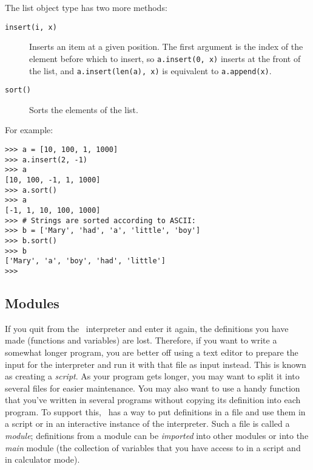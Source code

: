 The list object type has two more methods:
\begin{description}
\item[{\tt insert(i, x)}]
Inserts an item at a given position.
The first argument is the index of the element before which to insert,
so {\tt a.insert(0, x)} inserts at the front of the list, and
{\tt a.insert(len(a), x)} is equivalent to {\tt a.append(x)}.
\item[{\tt sort()}]
Sorts the elements of the list.
\end{description}
For example:
\bcode\begin{verbatim}
>>> a = [10, 100, 1, 1000]
>>> a.insert(2, -1)
>>> a
[10, 100, -1, 1, 1000]
>>> a.sort()
>>> a
[-1, 1, 10, 100, 1000]
>>> # Strings are sorted according to ASCII:
>>> b = ['Mary', 'had', 'a', 'little', 'boy']
>>> b.sort()
>>> b
['Mary', 'a', 'boy', 'had', 'little']
>>>
\end{verbatim}\ecode

\subsection{Modules}

If you quit from the \Python\ interpreter and enter it again, the
definitions you have made (functions and variables) are lost.
Therefore, if you want to write a somewhat longer program, you are
better off using a text editor to prepare the input for the interpreter
and run it with that file as input instead.
This is known as creating a
{\em script}.
As your program gets longer, you may want to split it into several files
for easier maintenance.
You may also want to use a handy function that you've written in several
programs without copying its definition into each program.
To support this, \Python\ has a way to put definitions in a file and use
them in a script or in an interactive instance of the interpreter.
Such a file is called a
{\em module};
definitions from a module can be
{\em imported}
into other modules or into the
{\em main}
module (the collection of variables that you have access to in
a script and in calculator mode).

